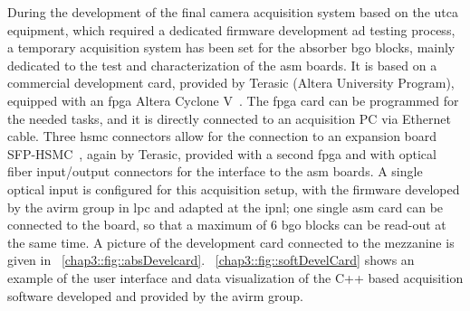 During the development of the final camera acquisition system based on the \gls{utca} equipment, which required a dedicated firmware development ad testing process, a temporary acquisition system has been set for the absorber \gls{bgo} blocks, mainly dedicated to the test and characterization of the \gls{asm} boards. It is based on a commercial development card, provided by Terasic (Altera University Program), equipped with an \gls{fpga} Altera Cyclone V~\parencite{Terasic2015}. The \gls{fpga} card can be programmed for the needed tasks, and it is directly connected to an acquisition PC via Ethernet cable. Three \gls{hsmc} connectors allow for the connection to an expansion board SFP-HSMC~\parencite{Terasic2009}, again by Terasic, provided with a second \gls{fpga} and with optical fiber input/output connectors for the interface to the \gls{asm} boards. A single optical input is configured for this acquisition setup, with the firmware developed by the \gls{avirm} group in \gls{lpc} and adapted at the \gls{ipnl}; one single \gls{asm} card can be connected to the board, so that a maximum of 6 \gls{bgo} blocks can be read-out at the same time. A picture of the development card connected to the mezzanine is given in \figurename~\ref{chap3::fig::absDevelcard}. \figurename~\ref{chap3::fig::softDevelCard} shows an example of the user interface and data visualization of the C++ based acquisition software developed and provided by the \gls{avirm} group.   

